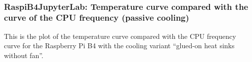 \documentclass [oneside,10pt,a4paper,ngerman,BCOR10mm,headsepline,parindent,final]{scrartcl}
\begin{document}
    \begin{center}
    \end{center}
    { \hspace*{\fill} \\}
    
    \hypertarget{raspib4jupyterlab-temperature-curve-compared-with-the-curve-of-the-cpu-frequency-passive-cooling}{%
\subsubsection{RaspiB4JupyterLab: Temperature curve compared with the
curve of the CPU frequency (passive
cooling)}\label{raspib4jupyterlab-temperature-curve-compared-with-the-curve-of-the-cpu-frequency-passive-cooling}}

This is the plot of the temperature curve compared with the CPU
frequency curve for the Raspberry Pi B4 with the cooling variant
``glued-on heat sinks without fan''.
\end{document}
